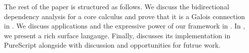 The rest of the paper is structured as follows. We discuss the bidirectional dependency analysis for a core calculus and prove that it is a Galois connection in . We discuss applications and the expressive power of our framework in . In , we present a rich surface langauge. Finally,  discusses its implementation in PureScript alongside with discussion and opportunities for futrue work.


